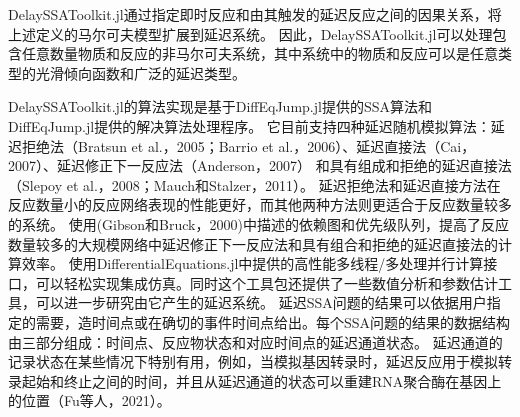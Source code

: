 DelaySSAToolkit.jl通过指定即时反应和由其触发的延迟反应之间的因果关系，将上述定义的马尔可夫模型扩展到延迟系统。
因此，DelaySSAToolkit.jl可以处理包含任意数量物质和反应的非马尔可夫系统，其中系统中的物质和反应可以是任意类型的光滑倾向函数和广泛的延迟类型。



DelaySSAToolkit.jl的算法实现是基于DiffEqJump.jl提供的SSA算法和DiffEqJump.jl提供的解决算法处理程序。
它目前支持四种延迟随机模拟算法：延迟拒绝法（Bratsun et al.，2005；Barrio et al.，2006）、延迟直接法（Cai，2007）、延迟修正下一反应法（Anderson，2007）
和具有组成和拒绝的延迟直接法（Slepoy et al.，2008；Mauch和Stalzer，2011）。
延迟拒绝法和延迟直接方法在反应数量小的反应网络表现的性能更好，而其他两种方法则更适合于反应数量较多的系统。
使用(Gibson和Bruck，2000)中描述的依赖图和优先级队列，提高了反应数量较多的大规模网络中延迟修正下一反应法和具有组合和拒绝的延迟直接法的计算效率。
使用DifferentialEquations.jl中提供的高性能多线程/多处理并行计算接口，可以轻松实现集成仿真。同时这个工具包还提供了一些数值分析和参数估计工具，可以进一步研究由它产生的延迟系统。
延迟SSA问题的结果可以依据用户指定的需要，造时间点或在确切的事件时间点给出。每个SSA问题的结果的数据结构由三部分组成：时间点、反应物状态和对应时间点的延迟通道状态。
延迟通道的记录状态在某些情况下特别有用，例如，当模拟基因转录时，延迟反应用于模拟转录起始和终止之间的时间，并且从延迟通道的状态可以重建RNA聚合酶在基因上的位置（Fu等人，2021）。 

